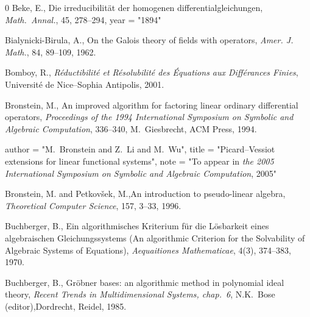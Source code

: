 \begin{thebibliography}{0}
Beke, E., Die irreducibilit{\"a}t  der homogenen
differentialgleichungen, {\em Math.~Annal.}, 45, 278--294,
 year = "1894"


Bialynicki-Birula, A., On the {G}alois theory of fields with
operators, {\em Amer. J. Math.}, 84, 89--109, 1962.


Bomboy, R., {\em R\'eductibilit\'e et R\'esolubilit\'e des
\'Equations aux Diff\'erances Finies}, Universit{\'e} de
Nice--Sophia Antipolis, 2001.







Bronstein, M., An improved algorithm for factoring linear ordinary
differential operators, {\em Proceedings of the 1994 International
Symposium on Symbolic and Algebraic Computation}, 336--340,
M.~Giesbrecht, ACM Press, 1994.



 author = "M.~Bronstein and Z.~Li and M.~Wu",
 title = "Picard--{V}essiot extensions for linear functional systems",
 note = "To appear in {\em the 2005 International Symposium on
 Symbolic and Algebraic Computation}, 2005"




Bronstein, M. and Petkov\v{s}ek, M.,An introduction to
pseudo-linear algebra, {\em Theoretical Computer Science}, 157,
3--33, 1996.


Buchberger, B., Ein algorithmisches {K}riterium f{\"u}r die
{L}{\"o}sbarkeit eines
            algebraischen {G}leichungssystems ({A}n algorithmic
          Criterion for the Solvability of Algebraic Systems of Equations),
          {\em Aequaitiones Mathematicae}, 4(3), 374--383,  1970.


Buchberger, B., Gr{\"o}bner bases: an algorithmic method in
polynomial ideal
           theory, {\em Recent Trends in Multidimensional Systems, {\rm chap.~6}},
 N.K.~Bose (editor),Dordrecht, Reidel, 1985.



\end{thebibliography}
